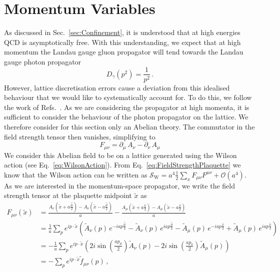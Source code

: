 \section{Momentum Variables}\label{sec:MomentumVariables}
As discussed in Sec.~\ref{sec:Confinement}, it is understood that at high energies QCD is asymptotically free. With this understanding, we expect that at high momentum the Landau gauge gluon propagator will tend towards the Landau gauge photon propagator~\cite{ryder1996quantum}
%
\begin{equation}
D_\gamma(p^2) = \frac{1}{p^2}\, .
\end{equation}
%
However, lattice discretisation errors cause a deviation from this idealised behaviour that we would like to systematically account for. To do this, we follow the work of Refs.~\cite{Weisz:1982zw, Weisz:1983bn,Luscher:1985zq,Symanzik:1983dc,Symanzik:1983gh}. As we are considering the propagator at high momenta, it is sufficient to consider the behaviour of the photon propagator on the lattice. We therefore consider for this section only an Abelian theory. The commutator in the field strength tensor then vanishes, simplifying to
%
\begin{equation}
F_{\mu\nu} = \partial_\mu \,A_\nu - \partial_\nu\,A_\mu
\end{equation}
%
We consider this Abelian field to be on a lattice generated using the Wilson action (see Eq.~\eqref{eq:WilsonAction}). From Eq.~\eqref{eq:FieldStrengthPlaquette} we know that the Wilson action can be written as $\mathcal{S}_\text{W} = a^4\frac{1}{2}\sum_x F_{\mu\nu}F^{\mu\nu} + \mathcal{O}(a^4)$. As we are interested in the momentum-space propagator, we write the field strength tensor at the plaquette midpoint $\tilde{x}$ as
%
\begin{align}
F_{\mu\nu}(\tilde{x}) &= \frac{A_\nu\left(\tilde{x}+a\frac{\hat{\mu}}{2}\right) - A_\nu\left(\tilde{x}-a\frac{\hat{\mu}}{2} \right)}{a} - \frac{A_\mu\left(\tilde{x}+a\frac{\hat{\nu}}{2}\right) - A_\mu\left(\tilde{x}-a\frac{\hat{\nu}}{2} \right)}{a}\nonumber\\
&= \frac{1}{a} \sum_p e^{ip\cdot\tilde{x}} \left(\tilde{A}_\nu(p)\, e^{-iap\frac{\hat{\mu}}{2}} - \tilde{A}_\nu(p)\, e^{iap\frac{\hat{\mu}}{2}} - \tilde{A}_\mu(p)\, e^{-iap\frac{\hat{\nu}}{2}} + \tilde{A}_\mu(p)\, e^{iap\frac{\hat{\nu}}{2}}\right)\nonumber\\
&= -\frac{1}{a} \sum_p e^{ip\cdot\tilde{x}}\left(2i\sin\left(\frac{a p_\mu}{2}\right)\tilde{A}_\nu(p) - 2i\sin\left(\frac{a p_\nu}{2}\right)\tilde{A}_\mu(p)\right)\nonumber\\
&= - \sum_p e^{ip\cdot\tilde{x}}\tilde{f}_{\mu\nu}(p)\, ,
\end{align}
